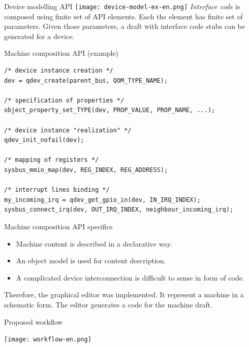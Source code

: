 \documentclass[unicode,hyperref={unicode=true},aspectratio=169]{beamer}
\begin{document}
\begin{frame}{Device modelling API}
\texttt{[image: device-model-ex-en.png]}
\vfill
\textit{Interface code} is composed using finite set of API elements. Each the
element has finite set of parameters. Given those parameters, a draft with
interface code stubs can be generated for a device.
\end{frame}



\begin{frame}[fragile]{Machine composition API (example)}
\lstset{language=C}
\begin{lstlisting}
/* device instance creation */
dev = qdev_create(parent_bus, QOM_TYPE_NAME);

/* specification of properties */
object_property_set_TYPE(dev, PROP_VALUE, PROP_NAME, ...);

/* device instance "realization" */
qdev_init_nofail(dev);

/* mapping of registers */
sysbus_mmio_map(dev, REG_INDEX, REG_ADDRESS);

/* interrupt lines binding */
my_incoming_irq = qdev_get_gpio_in(dev, IN_IRQ_INDEX);
sysbus_connect_irq(dev, OUT_IRQ_INDEX, neighbour_incoming_irq);
\end{lstlisting}
\end{frame}



\begin{frame}{Machine composition API specifics}

\begin{itemize}
\item Machine content is described in a declarative way.
\item An object model is used for content description.
\item A complicated device interconnection is difficult to sense in form of
code.
\end{itemize}

\begin{center}
Therefore, the graphical editor was implemented. It represent a machine in
a schematic form. The editor generates a code for the machine draft.
\end{center}

\end{frame}



\begin{frame}{Proposed workflow}
\begin{center}
\texttt{[image: workflow-en.png]}
\end{center}
\end{frame}
\end{document}

